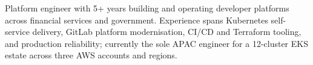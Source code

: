 Platform engineer with 5+ years building and operating developer platforms across financial services and government. Experience spans Kubernetes self-service delivery, GitLab platform modernisation, CI/CD and Terraform tooling, and production reliability; currently the sole APAC engineer for a 12-cluster EKS estate across three AWS accounts and regions.
